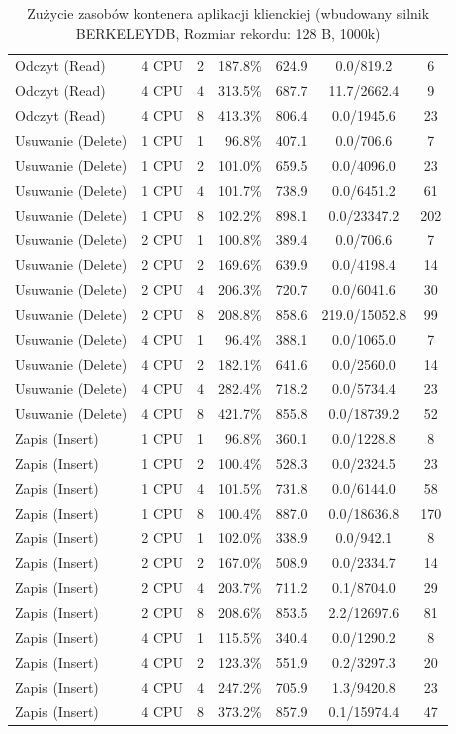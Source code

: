 \begin{table}[ht]
{\begin{tabular}{llcrrcc}
Odczyt (Read) & 4 CPU & 2 & 187.8\% & 624.9 & 0.0/819.2 & 6 \\
Odczyt (Read) & 4 CPU & 4 & 313.5\% & 687.7 & 11.7/2662.4 & 9 \\
Odczyt (Read) & 4 CPU & 8 & 413.3\% & 806.4 & 0.0/1945.6 & 23 \\
Usuwanie (Delete) & 1 CPU & 1 & 96.8\% & 407.1 & 0.0/706.6 & 7 \\
Usuwanie (Delete) & 1 CPU & 2 & 101.0\% & 659.5 & 0.0/4096.0 & 23 \\
Usuwanie (Delete) & 1 CPU & 4 & 101.7\% & 738.9 & 0.0/6451.2 & 61 \\
Usuwanie (Delete) & 1 CPU & 8 & 102.2\% & 898.1 & 0.0/23347.2 & 202 \\
Usuwanie (Delete) & 2 CPU & 1 & 100.8\% & 389.4 & 0.0/706.6 & 7 \\
Usuwanie (Delete) & 2 CPU & 2 & 169.6\% & 639.9 & 0.0/4198.4 & 14 \\
Usuwanie (Delete) & 2 CPU & 4 & 206.3\% & 720.7 & 0.0/6041.6 & 30 \\
Usuwanie (Delete) & 2 CPU & 8 & 208.8\% & 858.6 & 219.0/15052.8 & 99 \\
Usuwanie (Delete) & 4 CPU & 1 & 96.4\% & 388.1 & 0.0/1065.0 & 7 \\
Usuwanie (Delete) & 4 CPU & 2 & 182.1\% & 641.6 & 0.0/2560.0 & 14 \\
Usuwanie (Delete) & 4 CPU & 4 & 282.4\% & 718.2 & 0.0/5734.4 & 23 \\
Usuwanie (Delete) & 4 CPU & 8 & 421.7\% & 855.8 & 0.0/18739.2 & 52 \\
Zapis (Insert) & 1 CPU & 1 & 96.8\% & 360.1 & 0.0/1228.8 & 8 \\
Zapis (Insert) & 1 CPU & 2 & 100.4\% & 528.3 & 0.0/2324.5 & 23 \\
Zapis (Insert) & 1 CPU & 4 & 101.5\% & 731.8 & 0.0/6144.0 & 58 \\
Zapis (Insert) & 1 CPU & 8 & 100.4\% & 887.0 & 0.0/18636.8 & 170 \\
Zapis (Insert) & 2 CPU & 1 & 102.0\% & 338.9 & 0.0/942.1 & 8 \\
Zapis (Insert) & 2 CPU & 2 & 167.0\% & 508.9 & 0.0/2334.7 & 14 \\
Zapis (Insert) & 2 CPU & 4 & 203.7\% & 711.2 & 0.1/8704.0 & 29 \\
Zapis (Insert) & 2 CPU & 8 & 208.6\% & 853.5 & 2.2/12697.6 & 81 \\
Zapis (Insert) & 4 CPU & 1 & 115.5\% & 340.4 & 0.0/1290.2 & 8 \\
Zapis (Insert) & 4 CPU & 2 & 123.3\% & 551.9 & 0.2/3297.3 & 20 \\
Zapis (Insert) & 4 CPU & 4 & 247.2\% & 705.9 & 1.3/9420.8 & 23 \\
Zapis (Insert) & 4 CPU & 8 & 373.2\% & 857.9 & 0.1/15974.4 & 47 \\
\bottomrule
\end{tabular}%
}
\caption{Zużycie zasobów kontenera aplikacji klienckiej (wbudowany silnik BERKELEYDB, Rozmiar rekordu: 128 B, 1000k)}
\label{tab:resources_berkeleydb_small_1000000}
\end{table}
